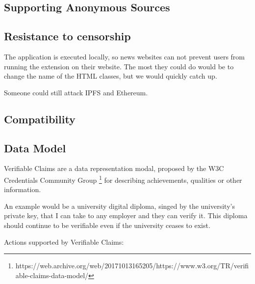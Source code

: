 
\subsection{Supporting Anonymous Sources}


\subsection{Resistance to censorship}

The application is executed locally, so news websites can not prevent users from running the extension on their website. The most they could do would be to change the name of the HTML classes, but we would quickly catch up.

Someone could still attack IPFS and Ethereum. 

\subsection{Compatibility}


\subsection{Data Model}

Verifiable Claims are a data representation modal, proposed by the W3C Credentials Community Group \footnote{https://web.archive.org/web/20171013165205/https://www.w3.org/TR/verifiable-claims-data-model/} for describing achievements, qualities or other information.

An example would be a university digital diploma, singed by the university’s private key, that I can take to any employer and they can verify it. This diploma should continue to be verifiable even if the university ceases to exist.

Actions supported by Verifiable Claims:

